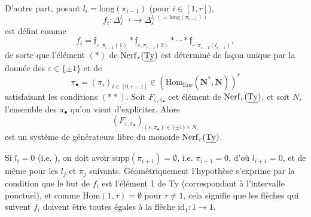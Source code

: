 \dgrchunkbegin

D'autre part, posant $l_i = \mathrm{long}(\pi_{i-1})$ (pour $i \in [1,r]$),
\[
f_i : \Delta_\varepsilon^{l_{i-1}} \longrightarrow \Delta_\varepsilon^{l_i\ (=\mathrm{long}(\pi_{i-1}))}
\]
est défini comme
\[
f_i = \mathfrak{f}_{\varepsilon,\pi_{i-1}(1)} * \mathfrak{f}_{\varepsilon,\pi_{i-1}(2)} * \cdots * \mathfrak{f}_{\varepsilon,\pi_{i-1}(l_{i-1})},
\]
de sorte que l'élément $(*)$ de $\mathrm{Nerf}_r(\underline{\mathrm{Ty}})$ est déterminé de façon unique par la donnée des $\varepsilon \in \{\pm 1\}$ et de
\[
\pi_\bullet = (\pi_i)_{i\in[0,r-1]} \in (\mathrm{Hom}_{\mathrm{Ens}}(\mathbf{N}^*,\mathbf{N}))^r
\]
satisfaisant les conditions $(**)$. Soit $F_{\varepsilon,\pi_\bullet}$ cet élément de $\mathrm{Nerf}_r(\underline{\mathrm{Ty}})$, et soit $N_r$ l'ensemble des $\pi_\bullet$ qu'on vient d'expliciter. Alors
\[
(F_{\varepsilon,\pi_\bullet})_{(\varepsilon,\pi_\bullet)\in\{\pm1\}\times N_r}
\]
est un système de générateurs libre du monoïde $\mathrm{Nerf}_r(\underline{\mathrm{Ty}})$.

Si $l_i = 0$ (i.e. ), on doit avoir $\mathrm{supp}(\pi_{i+1}) = \emptyset$, i.e. $\pi_{i+1} = 0$, d'où $l_{i+1} = 0$, et de même pour les $l_j$ et $\pi_j$ suivants. Géométriquement l'hypothèse s'exprime par la condition que le but
de $f_i$ est l'élément 1 de Ty (correspondant à l'intervalle ponctuel), et comme $\mathrm{Hom}(1,\tau) = \emptyset$ pour $\tau \neq 1$, cela signifie que les flèches qui suivent $f_i$ doivent être toutes égales à la flèche $\mathrm{id}_1 : 1 \longrightarrow 1$.

